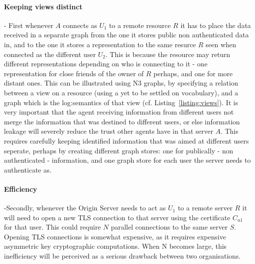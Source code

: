 \documentclass[a4paper]{llncs}
\begin{document}
\paragraph{Keeping views distinct}-
First whenever $A$ connects as $U_1$ to a remote resource $R$ it has to place the data received in a separate graph from the one it stores public non authenticated data in, and to the one it stores a representation to the same resurce $R$ seen when connected as the different user $U_2$. 
This is because the resource may return different representations depending on who is connecting to it - one representation for close friends of the owner of $R$ perhaps, and one for more distant ones. 
This can be illustrated using N3 graphs, by specifying a relation between a view on a resource (using a yet to be settled on vocabulary), and a graph which is the log:semantics of that view (cf. Listing~\ref{listing:views}). 
It is very important that the agent receiving information from different users not merge the information that was destined to different users, or else information leakage will severely reduce the trust other agents have in that server $A$. 
This requires carefully keeping identified information that was aimed at different users seperate, perhaps by creating different graph stores: one for publically - non authenticated - information, and one graph store for each user the server needs to authenticate as.



\paragraph{Efficiency}-Secondly, whenever the Origin Server needs to act as $U_1$ to a remote server $R$ it will need to open a new TLS connection to that server using the certificate $C_{u1}$ for that user.
This could require $N$ parallel connections to the same server $S$. 
Opening TLS connections is somewhat expensive, as it requires expensive asymmetric key cryptographic computations. 
When N becomes large, this inefficiency will be perceived as a serious drawback between two organisations.
 
\end{document}
